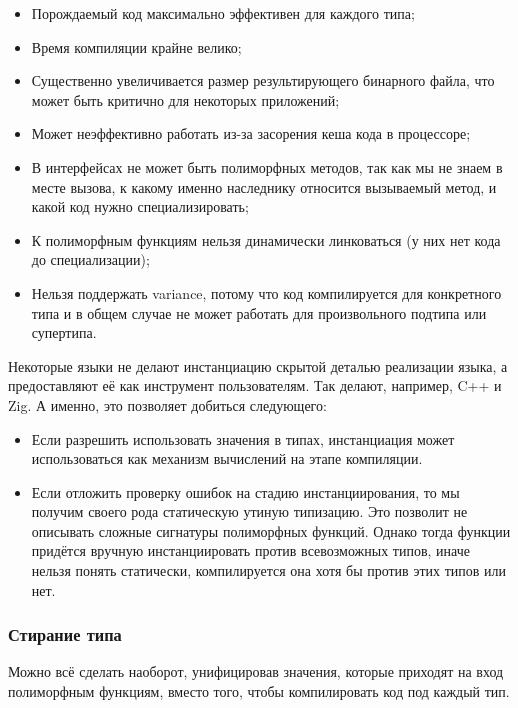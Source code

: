 \begin{itemize}
    \item[\positive] Порождаемый код максимально эффективен для каждого типа;
    \item[\negative] Время компиляции крайне велико;
    \item[\negative] Существенно увеличивается размер результирующего бинарного файла, что может быть критично для некоторых приложений;
    \item[\negative] Может неэффективно работать из-за засорения кеша кода в процессоре;
    \item[\negative] В интерфейсах не может быть полиморфных методов, так как мы не знаем в месте вызова, к какому именно наследнику относится вызываемый метод, и какой код нужно специализировать;
    \item[\negative] К полиморфным функциям нельзя динамически линковаться (у них нет кода до специализации);
    \item[\negative] Нельзя поддержать variance, потому что код компилируется для конкретного типа и в общем случае не может работать для произвольного подтипа или супертипа.
\end{itemize}

Некоторые языки не делают инстанциацию скрытой деталью реализации языка, а предоставляют её как инструмент пользователям.
Так делают, например, C++ и Zig.
А именно, это позволяет добиться следующего:
\begin{itemize}
    \item Если разрешить использовать значения в типах, инстанциация может использоваться как механизм вычислений на этапе компиляции.
    \item Если отложить проверку ошибок на стадию инстанциирования, то мы получим своего рода статическую утиную типизацию.
    Это позволит не описывать сложные сигнатуры полиморфных функций.
    Однако тогда функции придётся вручную инстанциировать против всевозможных типов, иначе нельзя понять статически, компилируется она хотя бы против этих типов или нет.
\end{itemize}

\subsubsection{Стирание типа} \label{subsubsec:type-erasure}

Можно всё сделать наоборот, унифицировав значения, которые приходят на вход полиморфным функциям, вместо того, чтобы компилировать код под каждый тип.

